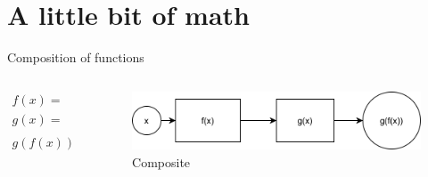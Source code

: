 \section{A little bit of math}

\begin{frame}{Composition of functions} 
	\begin{columns}
		\begin{column}{.5\textwidth} 
			\begin{align}
				f(x)=& ax+b \\
				g(x)=&  \frac{1}{e^{-x}+1} \\
				g(f(x)) =& \frac{1}{e^{-(ax+b)}+1}   
			\end{align}
		\end{column}
		\begin{column}{.5\textwidth}
			\begin{figure}
				\includegraphics[width=.8\textwidth, center]{figures/function_composition}
				\caption*{Composite}
			\end{figure}
		\end{column}
	\end{columns}
\end{frame}

